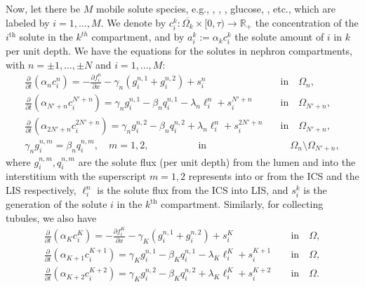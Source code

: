 \documentclass{article}
\begin{document}
Now, let there be $M$ mobile solute species, e.g., , , , glucose, , etc., which are labeled by $i=1,\dots,M$.
We denote by $c_i^k:\overline{\Omega_k}\times [0,\tau)\to \mathbb{R}_+$ the concentration of the $i^{\mathrm{th}}$ solute in the $k^{th}$ compartment, and by $a_i^k:=\alpha_kc_i^k$ the solute amount of $i$ in $k$ per unit depth.
We have the equations for the solutes in nephron compartments, with $n=\pm 1,\dots,\pm N$ and $i=1,\dots,M$:
\begin{align}
    \frac{\partial }{\partial t}(\alpha_nc_i^n) = -\frac{\partial f_i^n}{\partial x}-\gamma_n(g_i^{n,1}+g_i^{n,2})+s_i^{n} \qquad \ &\text{in}\quad \Omega_{n},\\
    \frac{\partial }{\partial t}(\alpha_{N'+n}c_i^{N'+n}) = \gamma_{n}g_i^{n,1}-\beta_nq_i^{n,1}-\lambda_n\ell_i^n+s_i^{N'+n} \quad \ &\text{in}\quad \Omega_{N'+n},\\
    \frac{\partial }{\partial t}(\alpha_{2N'+n} c_i^{2N'+n}) = \gamma_{n}g_i^{n,2}-\beta_nq_i^{n,2}+\lambda_n\ell_i^n+s_i^{2N'+n}\quad &\text{in}\quad \Omega_{N'+n},\\
    \gamma_ng_i^{n,m} = \beta_nq_i^{n,m},\quad m=1,2, \qquad \qquad \quad \text{in}&\quad \Omega_n\setminus\Omega_{N'+n},
\end{align}
    where $g_i^{n,m},q_i^{n,m}$ are the solute flux (per unit depth) from the lumen and into the interstitium with the superscript $m=1,2$ represents into or from the ICS and the LIS respectively, $\ell_i^n$ is the solute flux from the ICS into LIS, and $s_i^{k}$ is the generation of the solute $i$ in the $k^{\mathrm{th}}$ compartment.
Similarly, for collecting tubules, we also have
\begin{align}
    \frac{\partial }{\partial t}(\alpha_Kc_i^K) = -\frac{\partial f_i^K}{\partial x}-\gamma_K(g_i^{n,1}+g_i^{n,2})+s_i^K \qquad \ &\text{in}\quad \Omega,\\
    \frac{\partial }{\partial t}(\alpha_{K+1}c_i^{K+1}) = \gamma_Kg_i^{n,1}-\beta_Kq_i^{n,1}-\lambda_K\ell_i^K+s_i^{K+1} \quad \ &\text{in}\quad \Omega,\\
    \frac{\partial }{\partial t}(\alpha_{K+2} c_i^{K+2}) = \gamma_Kg_i^{n,2}-\beta_Kq_i^{n,2}+\lambda_K\ell_i^K+s_i^{K+2}\quad &\text{in}\quad \Omega.
\end{align}
\end{document}
